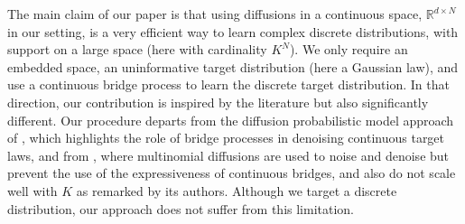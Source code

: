 \documentclass{article}
\theoremstyle{plain}
\theoremstyle{definition}
\theoremstyle{remark}
\begin{document}
 The main claim of our paper is that using diffusions in a continuous space,  $\mathbb{R}^{d \times N}$ in our setting, is a very efficient way to learn complex discrete distributions, with support on a large space (here with cardinality $K^N$). We only require an embedded space, an uninformative target distribution (here a Gaussian law), and use a continuous bridge process to learn the discrete target distribution. In that direction, our contribution is inspired by the literature but also significantly different. Our procedure departs from the diffusion probabilistic model approach of \cite{ho2020denoising}, which highlights the role of bridge processes in denoising continuous target laws, and from \cite{hoogeboom2021argmax},  where multinomial diffusions are used to noise and denoise but prevent the use of the expressiveness of continuous bridges, and also do not scale well with $K$ as remarked by its authors. Although we target a discrete distribution, our approach does not suffer from this limitation.
\end{document}
